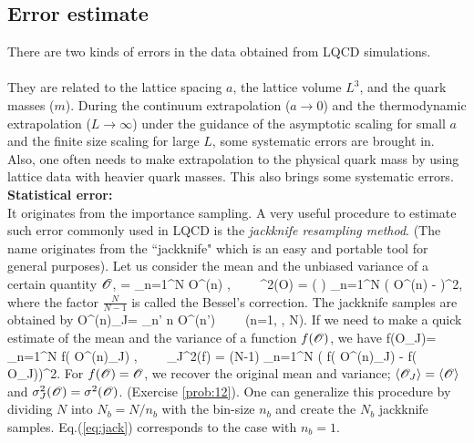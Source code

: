 \subsection{Error estimate}

There are two kinds of errors  in the data obtained from  LQCD simulations.\\

 \\
 They are related to the lattice spacing $a$, the lattice volume $L^3$,
  and the quark masses ($m$).  During 
  the continuum extrapolation ($a\rightarrow 0$) and the thermodynamic extrapolation ($L \rightarrow \infty$) 
  under the  guidance of  the asymptotic scaling for small $a$ 
 and the finite size scaling for  large $L$, some systematic errors are brought in.
 Also,  one often needs to make extrapolation to the physical quark mass by using 
 lattice data  with heavier  quark masses. This  also brings some
 systematic errors.\\
 
 \noindent
{\bf Statistical error:} \\
It originates from the importance sampling.  A very useful procedure to estimate such error
 commonly used in LQCD is the {\it jackknife resampling method}. (The name
  originates from the ``jackknife"  which is an easy and  portable  tool  for general purposes).
  Let us consider the mean and the unbiased variance of a certain quantity $ {\cal O}$,
  \beq
    \rangle =  \sum_{n=1}^N {\cal O}^{(n)}  \pm {}, \ \ \ \
   \sigma^2({\cal O}) = \left(  \right)   \sum_{n=1}^N ( {\cal O}^{(n)}  -  \rangle )^2,
  \eeq
where the factor $\frac{N}{N-1}$ is called the Bessel's correction.
 The jackknife samples are obtained by
 \beq
  {\cal O}^{(n)}_J=  \sum_{n' \neq n}  {\cal O}^{(n')}      \ \ \ \  (n=1, \cdots, N).
 \eeq
 If we need to make a quick estimate of the 
  mean and the variance of a function $f({\cal O})$, we have
 \beq
\label{eq:jack}
 \langle f({\cal O}_J)\rangle =  \sum_{n=1}^{N} f( {\cal O}^{(n)}_J) \pm  {}, \ \ \ \ 
  \sigma_J^2(f) = (N-1) \sum_{n=1}^N ( f( {\cal O}^{(n)}_J) -  \langle f( {\cal O}_J)\rangle)^2. 
\eeq
For $f( {\cal O})={\cal O}$, we recover the original  mean and variance;
 $\langle  {\cal O}_J \rangle = \langle  {\cal O} \rangle$ and  $\sigma_J^2({\cal O})=\sigma^2({\cal O})$. (Exercise \ref{prob:12}).
One can generalize this procedure by dividing $N$ into $N_b=N/n_b$  
with the bin-size $n_b$ and create the $N_b$ jackknife samples. 
 Eq.(\ref{eq:jack})  corresponds to the case with $n_b=1$.

